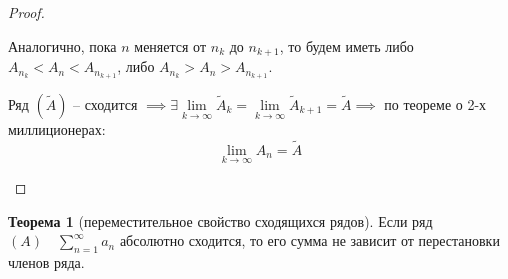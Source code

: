 \documentclass{report}
\theoremstyle{definition}
\newtheorem{theorem}{Теорема}[section]
\begin{document}
\begin{proof}
\begin{enumerate}
          Аналогично, пока $n$ меняется от $n_k$ до $n_{k+1}$, то будем иметь либо $A_{n_k} < A_n < A_{n_{k+1}}$, либо $A_{n_k} > A_n > A_{n_{k+1}}$.

          Ряд $(\widetilde{A})$ -- сходится $\implies \exists \underset{k\rightarrow\infty}{\lim}\widetilde{A}_k = \underset{k\rightarrow\infty}{\lim}\widetilde{A}_{k+1} = \widetilde{A} \implies$ по теореме о 2-х миллиционерах:
          \begin{equation*}
            \underset{k\rightarrow\infty}{\lim}A_n = \widetilde{A}
          \end{equation*}
  \end{enumerate}
\end{proof}

\begin{theorem}[переместительное свойство сходящихся рядов]
  Если ряд $(A) \quad \sum_{n=1}^{\infty}a_n$ абсолютно сходится, то его сумма не зависит от перестановки членов ряда.
\end{theorem}
\end{document}
